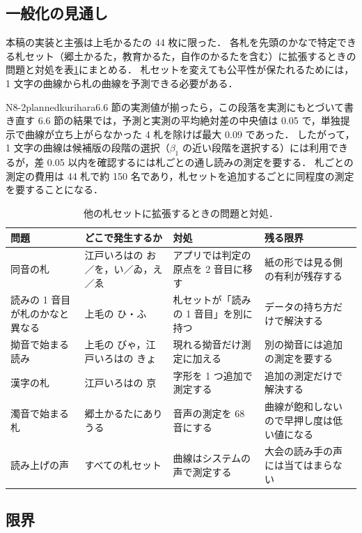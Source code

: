 \subsection{一般化の見通し}

本稿の実装と主張は上毛かるたの 44 枚に限った．
各札を先頭のかなで特定できる札セット（郷土かるた，教育かるた，自作のかるたを含む）に拡張するときの問題と対処を表\ref{tab:generalize}にまとめる．
札セットを変えても公平性が保たれるためには，1 文字の曲線から札の曲線を予測できる必要がある．
\begin{fd}{N8-2}{planned}{kurihara}{6.6 節の実測値が揃ったら，この段落を実測にもとづいて書き直す}
6.6 節の結果では，予測と実測の平均絶対差の中央値は 0.05 で，単独提示で曲線が立ち上がらなかった 4 札を除けば最大 0.09 であった．
したがって，1 文字の曲線は候補版の段階の選択（$\beta_1$ の近い段階を選択する）には利用できるが，差 0.05 以内を確認するには札ごとの通し読みの測定を要する．
札ごとの測定の費用は 44 札で約 150 名であり，札セットを追加するごとに同程度の測定を要することになる．
\end{fd}

\begin{table}[tb]
\caption{他の札セットに拡張するときの問題と対処．}
\label{tab:generalize}
\centering
\small
\begin{tabular}{p{2.8cm}p{4.2cm}p{4.5cm}p{4.2cm}}
\hline\hline
問題 & どこで発生するか & 対処 & 残る限界 \\
\hline
同音の札 & 江戸いろはの お／を，い／ゐ，え／ゑ & アプリでは判定の原点を 2 音目に移す & 紙の形では見る側の有利が残存する \\
読みの 1 音目が札のかなと異なる & 上毛の ひ・ふ & 札セットが「読みの 1 音目」を別に持つ & データの持ち方だけで解決する \\
拗音で始まる読み & 上毛の びゃ，江戸いろはの きょ & 現れる拗音だけ測定に加える & 別の拗音には追加の測定を要する \\
漢字の札 & 江戸いろはの 京 & 字形を 1 つ追加で測定する & 追加の測定だけで解決する \\
濁音で始まる札 & 郷土かるたにありうる & 音声の測定を 68 音にする & 曲線が飽和しないので早押し度は低い値になる \\
読み上げの声 & すべての札セット & 曲線はシステムの声で測定する & 大会の読み手の声には当てはまらない \\
\hline
\end{tabular}
\end{table}

\subsection{限界}

